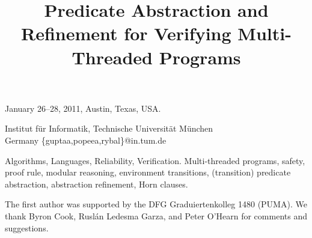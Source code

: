 \documentclass{sigplanconf}
\begin{document}
 {January 26--28, 2011, Austin, Texas, USA.}

\titlebanner{}        %
\preprintfooter{}   %

\title{Predicate Abstraction and Refinement for Verifying Multi-Threaded Programs}



           {Institut f\"ur Informatik, Technische Universit\"at M\"unchen\\Germany}
           {\{guptaa,popeea,rybal\}@in.tum.de}

\maketitle

\terms
Algorithms, Languages, Reliability, Verification.
\keywords
Multi-threaded programs, safety, proof rule,
modular reasoning, environment transitions, (transition) predicate
abstraction, abstraction refinement, Horn clauses.


\vspace{-0.3cm}
\acks

The first author was supported by the DFG Graduiertenkolleg 1480 (PUMA).
We thank Byron Cook, Rusl\'an Ledesma Garza, and Peter O'Hearn for
comments and suggestions.







\end{document}
